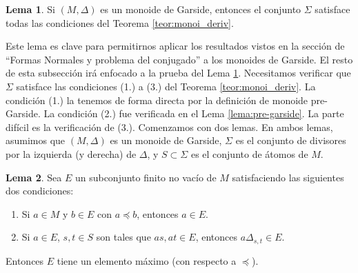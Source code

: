 \documentclass[12pt]{book}
\theoremstyle{definition}
\newtheorem{lema}{Lema}[section]
\begin{document}
\begin{lema}
Si $(M,\Delta)$ es un monoide de Garside, entonces el conjunto $\Sigma$ satisface todas las condiciones del Teorema \ref{teor:monoi_deriv}.
\label{lema:garside}
\end{lema}

Este lema es clave para permitirnos aplicar los resultados vistos en la sección de ``Formas Normales y problema del conjugado'' a los monoides de Garside. El resto de esta subsección irá enfocado a la prueba del Lema \ref{lema:garside}. Necesitamos verificar que $\Sigma$ satisface las condiciones (1.) a (3.) del Teorema \ref{teor:monoi_deriv}. La condición (1.) la tenemos de forma directa por la definición de monoide pre-Garside. La condición (2.) fue verificada en el Lema \ref{lema:pre-garside}. La parte difícil es la verificación de (3.). Comenzamos con dos lemas. En ambos lemas, asumimos que $(M,\Delta)$ es un monoide de Garside, $\Sigma$ es el conjunto de divisores por la izquierda (y derecha) de $\Delta$, y $S\subset \Sigma$ es el conjunto de átomos de $M$.

\begin{lema}
Sea $E$ un subconjunto finito no vacío de $M$ satisfaciendo las siguientes dos condiciones:
\begin{enumerate}[label=(\roman*).]
\item Si $a\in M$ y $b\in E$ con $a\preceq b$, entonces $a\in E$.
\item Si $a\in E$, $s,t\in S$ son tales que $as,at\in E$, entonces $a\Delta_{s,t}\in E$.
\end{enumerate}
Entonces $E$ tiene un elemento máximo (con respecto a $\preceq$).
\label{lema:garside1}
\end{lema}
\end{document}
